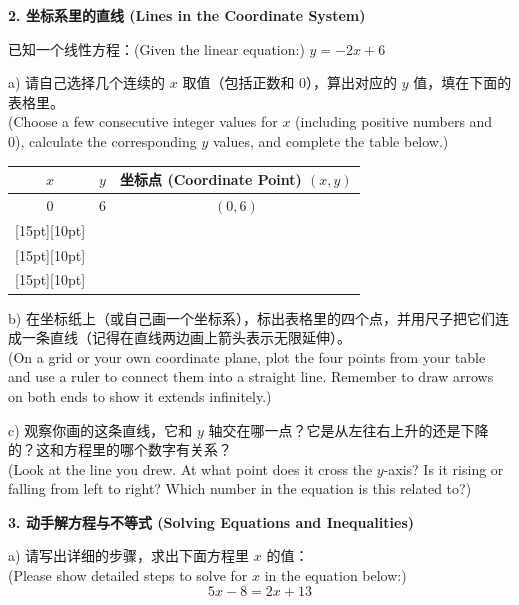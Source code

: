 \documentclass[12pt]{article}
\begin{document}
\newpage

\textbf{2. 坐标系里的直线 (Lines in the Coordinate System)}

已知一个线性方程：(Given the linear equation:) $y = -2x + 6$

a) 请自己选择几个连续的 $x$ 取值（包括正数和 0），算出对应的 $y$ 值，填在下面的表格里。\\
(Choose a few consecutive integer values for $x$ (including positive numbers and 0), calculate the corresponding $y$ values, and complete the table below.)

\vspace{0.3cm}
\begin{table}[ht]
\centering
\begin{tabular}{|c|c|c|}
\hline
$x$ & $y$ & 坐标点 (Coordinate Point) $(x, y)$ \\
\hline
0 & 6 & $(0, 6)$ \\
\hline
\raisebox{0pt}[15pt][10pt]{}  & & \\
\hline
\raisebox{0pt}[15pt][10pt]{}  & & \\
\hline
\raisebox{0pt}[15pt][10pt]{}  & & \\
\hline
\end{tabular}
\end{table}
\vspace{0.3cm}

b) 在坐标纸上（或自己画一个坐标系），标出表格里的四个点，并用尺子把它们连成一条直线（记得在直线两边画上箭头表示无限延伸）。\\
(On a grid or your own coordinate plane, plot the four points from your table and use a ruler to connect them into a straight line. Remember to draw arrows on both ends to show it extends infinitely.)
\vspace{6cm}

c) 观察你画的这条直线，它和 $y$ 轴交在哪一点？它是从左往右上升的还是下降的？这和方程里的哪个数字有关系？\\
(Look at the line you drew. At what point does it cross the $y$-axis? Is it rising or falling from left to right? Which number in the equation is this related to?)
\vspace{3cm}

\newpage

\textbf{3. 动手解方程与不等式 (Solving Equations and Inequalities)}

a) 请写出详细的步骤，求出下面方程里 $x$ 的值：\\
(Please show detailed steps to solve for $x$ in the equation below:)
\[ 5x - 8 = 2x + 13 \]
\vspace{5cm}
\end{document}
